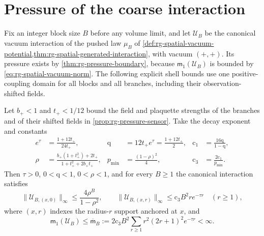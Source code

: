 \section{Pressure of the coarse interaction}
\label{sec:rg-pressure-coarse}

Fix an integer block size $B$ before any volume limit, and let $\mathscr U_B$ be
the canonical vacuum interaction of the pushed law $\mu_B$ of
\cref{def:rg-spatial-vacuum-potential,thm:rg-spatial-generated-interaction},
with vacuum $(+,+)$. Its pressure exists by \cref{thm:rg-pressure-boundary},
because $\mathsf m_1(\mathscr U_B)$ is bounded by \cref{eq:rg-spatial-vacuum-norm}.
The following explicit shell bounds use one positive-coupling domain for all
blocks and all branches, including their observation-shifted fields.

Let $b_+<1$ and $t_+<1/12$ bound the field and plaquette strengths of the
branches and of their shifted fields in \cref{prop:rg-pressure-sensor}. Take
the decay exponent and constants
\begin{align}
 e^{\tau}&=\frac{1+12t_+}{24t_+},&
 \mathrm q&=12t_+e^\tau=\frac{1+12t_+}{2},& \mathrm c_1&=\frac{16\mathrm q}{1-\mathrm q},
 \label{eq:rg-pressure-locality-constants}\\
 \rho&=\frac{b_+(1+t_+^2)+2t_+}{1+t_+^2+2b_+t_+},&
 p_{\min}&=\frac{(1-\rho)^2}{4},&\mathrm c_3&=\frac{2\mathrm c_1}{p_{\min}}.
 \label{eq:rg-pressure-positive-constants}
\end{align}
Then $\tau>0$, $0<\mathrm q<1$, $0<\rho<1$, and for every $B\geq1$ the canonical
interaction satisfies
\begin{equation}
 \|\mathscr U_{B,(x,0)}\|_\infty\leq\frac{4\rho^B}{1-\rho^2},\qquad
 \|\mathscr U_{B,(x,r)}\|_\infty\leq \mathrm c_3B^2re^{-\tau r}\quad(r\geq1),
 \label{eq:rg-pressure-shell}
\end{equation}
where $(x,r)$ indexes the radius-$r$ support anchored at $x$, and
\begin{equation}
 \mathsf m_1(\mathscr U_B)\leq\overline{\mathsf m}_B
 :=2\mathrm c_3B^2\sum_{r\geq1}r^2(2r+1)^2e^{-\tau r}<\infty.
 \label{eq:rg-pressure-coarse-moment}
\end{equation}

